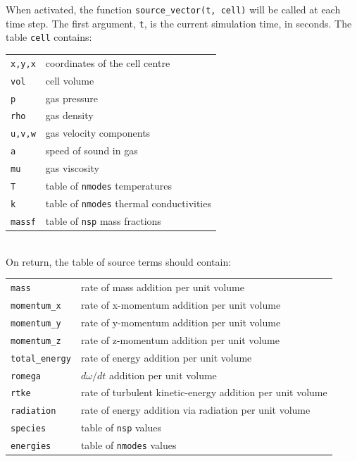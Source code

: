 \bigskip
When activated, the function \texttt{source\_vector(t, cell)} will be called at each time step.
The first argument, \texttt{t}, is the current simulation time, in seconds.
The table \texttt{cell} contains:\\
\begin{tabular}{ll}
 \texttt{x,y,x} & coordinates of the cell centre \\
 \texttt{vol} & cell volume \\
 \texttt{p} & gas pressure \\
 \texttt{rho} & gas density \\
 \texttt{u,v,w} & gas velocity components \\
 \texttt{a} & speed of sound in gas \\
 \texttt{mu} & gas viscosity \\
 \texttt{T} & table of \texttt{nmodes} temperatures \\
 \texttt{k} & table of \texttt{nmodes} thermal conductivities \\
 \texttt{massf} & table of \texttt{nsp} mass fractions \\
\end{tabular}\\
On return, the table of source terms should contain:\\
\begin{tabular}{ll}
 \texttt{mass} &  rate of mass addition per unit volume\\
 \texttt{momentum\_x} & rate of x-momentum addition per unit volume\\
 \texttt{momentum\_y} & rate of y-momentum addition per unit volume\\
 \texttt{momentum\_z} & rate of z-momentum addition per unit volume\\
 \texttt{total\_energy} & rate of energy addition per unit volume\\
 \texttt{romega} & $d\omega/dt$ addition per unit volume\\
 \texttt{rtke} & rate of turbulent kinetic-energy addition per unit volume\\
 \texttt{radiation} & rate of energy addition via radiation per unit volume\\
 \texttt{species} & table of \texttt{nsp} values\\
 \texttt{energies} & table of \texttt{nmodes} values\\
\end{tabular}\\

